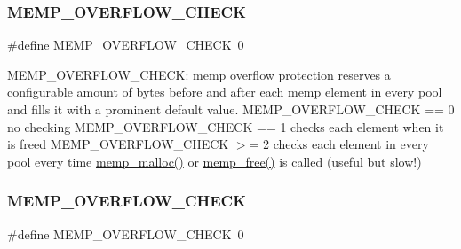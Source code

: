 \subsubsection{\texorpdfstring{M\+E\+M\+P\+\_\+\+O\+V\+E\+R\+F\+L\+O\+W\+\_\+\+C\+H\+E\+CK}{MEMP\_OVERFLOW\_CHECK}\hspace{0.1cm}{\footnotesize\ttfamily [1/2]}}
{\footnotesize\ttfamily \#define M\+E\+M\+P\+\_\+\+O\+V\+E\+R\+F\+L\+O\+W\+\_\+\+C\+H\+E\+CK~0}

M\+E\+M\+P\+\_\+\+O\+V\+E\+R\+F\+L\+O\+W\+\_\+\+C\+H\+E\+CK\+: memp overflow protection reserves a configurable amount of bytes before and after each memp element in every pool and fills it with a prominent default value. M\+E\+M\+P\+\_\+\+O\+V\+E\+R\+F\+L\+O\+W\+\_\+\+C\+H\+E\+CK == 0 no checking M\+E\+M\+P\+\_\+\+O\+V\+E\+R\+F\+L\+O\+W\+\_\+\+C\+H\+E\+CK == 1 checks each element when it is freed M\+E\+M\+P\+\_\+\+O\+V\+E\+R\+F\+L\+O\+W\+\_\+\+C\+H\+E\+CK $>$= 2 checks each element in every pool every time \hyperlink{native_2lwip_2src_2core_2memp_8c_a2b00593d086313c267b54a976bf67aa5}{memp\+\_\+malloc()} or \hyperlink{native_2lwip_2src_2core_2memp_8c_aecd94926b7c2a0e23ae195f4ae97581f}{memp\+\_\+free()} is called (useful but slow!) \mbox{\label{group__lwip__opts__mem_ga27fdd01194a42fc41a7716b72cdb49e3}} 
\subsubsection{\texorpdfstring{M\+E\+M\+P\+\_\+\+O\+V\+E\+R\+F\+L\+O\+W\+\_\+\+C\+H\+E\+CK}{MEMP\_OVERFLOW\_CHECK}\hspace{0.1cm}{\footnotesize\ttfamily [2/2]}}
{\footnotesize\ttfamily \#define M\+E\+M\+P\+\_\+\+O\+V\+E\+R\+F\+L\+O\+W\+\_\+\+C\+H\+E\+CK~0}

